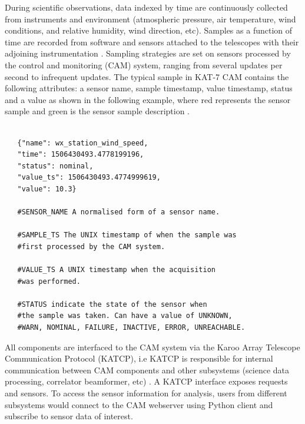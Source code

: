 During scientific observations, data indexed by time are continuously collected from instruments and  environment (atmospheric pressure, air temperature,  wind conditions, and relative humidity, wind direction, etc). Samples as a function of time are recorded from software and sensors attached to the telescopes with their adjoining instrumentation \citep{slabberICALEPCS2017}. Sampling strategies are set on sensors processed by the control and monitoring (CAM) system, ranging from several updates per second to infrequent updates. The typical sample in KAT-7 CAM contains the following attributes: a sensor name, sample timestamp, value timestamp, status and a value as shown in the following example, where red represents the sensor sample and green is the sensor sample description  \citep{slabber2015overview, slabber2015illustrate}. 

 

\begin{tcolorbox} 
\begin{lstlisting}

   {"name": wx_station_wind_speed,
   "time": 1506430493.4778199196,
   "status": nominal,
   "value_ts": 1506430493.4774999619,
   "value": 10.3}

   #SENSOR_NAME A normalised form of a sensor name.

   #SAMPLE_TS The UNIX timestamp of when the sample was
   #first processed by the CAM system.

   #VALUE_TS A UNIX timestamp when the acquisition
   #was performed. 

   #STATUS indicate the state of the sensor when
   #the sample was taken. Can have a value of UNKNOWN,
   #WARN, NOMINAL, FAILURE, INACTIVE, ERROR, UNREACHABLE. 
\end{lstlisting}
\end{tcolorbox}

All components are interfaced to the CAM system via the Karoo Array Telescope Communication Protocol (KATCP), i.e KATCP is responsible for internal communication between CAM components and other subsystems (science data processing, correlator beamformer, etc) \citep{slabber2015overview}. A KATCP interface exposes requests and sensors. To access the sensor information for analysis, users from different subsystems  would  connect to the CAM webserver using Python client and subscribe to sensor data of interest. 


